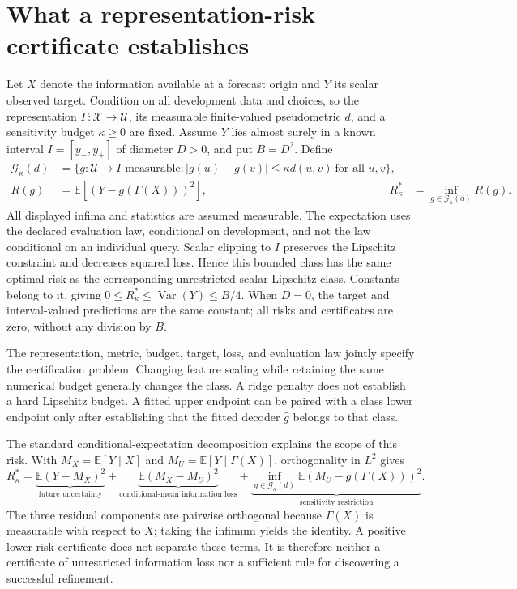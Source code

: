 
\section{What a representation-risk certificate establishes}
\label{sec:object}

Let $X$ denote the information available at a forecast origin and $Y$ its
scalar observed target. Condition on all development data and choices, so
the representation $\Gamma:\mathcal X\to\mathcal U$, its measurable
finite-valued pseudometric $d$, and a sensitivity budget $\kappa\geq0$ are
fixed. Assume $Y$ lies almost surely in a known interval
$I=[y_-,y_+]$ of diameter $D>0$, and put $B=D^2$.
Define
\begin{align}
 \mathcal G_\kappa(d)
 &=\{g:\mathcal U\to I\text{ measurable}:
       |g(u)-g(v)|\leq\kappa d(u,v)\ \text{for all }u,v\},
       \label{eq:class}\\
 R(g)&=\mathbb E[(Y-g(\Gamma(X)))^2],
 &R^*_\kappa&=\inf_{g\in\mathcal G_\kappa(d)}R(g).
       \label{eq:risk}
\end{align}
All displayed infima and statistics are assumed measurable. The expectation
uses the declared evaluation law, conditional on development, and not the
law conditional on an individual query. Scalar clipping to $I$ preserves
the Lipschitz constraint and decreases squared loss. Hence this bounded
class has the same optimal risk as the corresponding unrestricted scalar
Lipschitz class. Constants belong to it, giving
$0\leq R^*_\kappa\leq\operatorname{Var}(Y)\leq B/4$.
When $D=0$, the target and interval-valued predictions are the same constant;
all risks and certificates are zero, without any division by $B$.

The representation, metric, budget, target, loss, and evaluation law jointly
specify the certification problem. Changing feature scaling while retaining
the same numerical budget generally changes the class. A ridge penalty
does not establish a hard Lipschitz budget. A fitted upper endpoint can be
paired with a class lower endpoint only after establishing that the fitted
decoder $\widehat g$ belongs to that class.

The standard conditional-expectation decomposition explains the scope of
this risk. With $M_X=\mathbb E[Y\mid X]$ and
$M_U=\mathbb E[Y\mid\Gamma(X)]$, orthogonality in $L^2$ gives
\begin{equation}
 R^*_\kappa
 =\underbrace{\mathbb E(Y-M_X)^2}_{\text{future uncertainty}}
  +\underbrace{\mathbb E(M_X-M_U)^2}_{\text{conditional-mean information loss}}
  +\underbrace{\inf_{g\in\mathcal G_\kappa(d)}
       \mathbb E(M_U-g(\Gamma(X)))^2}_{\text{sensitivity restriction}}.
 \label{eq:decomposition}
\end{equation}
The three residual components are pairwise orthogonal because
$\Gamma(X)$ is measurable with respect to $X$; taking the infimum yields
the identity. A positive lower risk certificate does not separate these
terms. It is therefore neither a certificate of unrestricted information
loss nor a sufficient rule for discovering a successful refinement.

